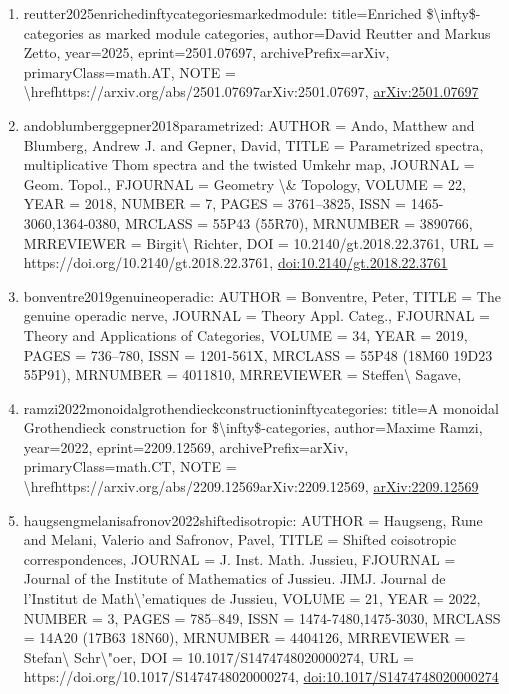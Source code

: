 \documentclass[11pt]{article}
\begin{document}
\begin{enumerate}[leftmargin=*]
  \item reutter2025enrichedinftycategoriesmarkedmodule: title=Enriched \$\textbackslash{}infty\$-categories as marked module categories, author=David Reutter and Markus Zetto, year=2025, eprint=2501.07697, archivePrefix=arXiv, primaryClass=math.AT, NOTE = \textbackslash{}hrefhttps://arxiv.org/abs/2501.07697arXiv:2501.07697, \href{https://arxiv.org/abs/2501.07697}{arXiv:2501.07697}
  \item andoblumberggepner2018parametrized: AUTHOR = Ando, Matthew and Blumberg, Andrew J. and Gepner, David, TITLE = Parametrized spectra, multiplicative Thom spectra and the twisted Umkehr map, JOURNAL = Geom. Topol., FJOURNAL = Geometry \textbackslash{}\& Topology, VOLUME = 22, YEAR = 2018, NUMBER = 7, PAGES = 3761--3825, ISSN = 1465-3060,1364-0380, MRCLASS = 55P43 (55R70), MRNUMBER = 3890766, MRREVIEWER = Birgit\textbackslash{} Richter, DOI = 10.2140/gt.2018.22.3761, URL = https://doi.org/10.2140/gt.2018.22.3761, \href{https://doi.org/10.2140/gt.2018.22.3761}{doi:10.2140/gt.2018.22.3761}
  \item bonventre2019genuineoperadic: AUTHOR = Bonventre, Peter, TITLE = The genuine operadic nerve, JOURNAL = Theory Appl. Categ., FJOURNAL = Theory and Applications of Categories, VOLUME = 34, YEAR = 2019, PAGES = 736--780, ISSN = 1201-561X, MRCLASS = 55P48 (18M60 19D23 55P91), MRNUMBER = 4011810, MRREVIEWER = Steffen\textbackslash{} Sagave,
  \item ramzi2022monoidalgrothendieckconstructioninftycategories: title=A monoidal Grothendieck construction for \$\textbackslash{}infty\$-categories, author=Maxime Ramzi, year=2022, eprint=2209.12569, archivePrefix=arXiv, primaryClass=math.CT, NOTE = \textbackslash{}hrefhttps://arxiv.org/abs/2209.12569arXiv:2209.12569, \href{https://arxiv.org/abs/2209.12569}{arXiv:2209.12569}
  \item haugsengmelanisafronov2022shiftedisotropic: AUTHOR = Haugseng, Rune and Melani, Valerio and Safronov, Pavel, TITLE = Shifted coisotropic correspondences, JOURNAL = J. Inst. Math. Jussieu, FJOURNAL = Journal of the Institute of Mathematics of Jussieu. JIMJ. Journal de l'Institut de Math\textbackslash{}'ematiques de Jussieu, VOLUME = 21, YEAR = 2022, NUMBER = 3, PAGES = 785--849, ISSN = 1474-7480,1475-3030, MRCLASS = 14A20 (17B63 18N60), MRNUMBER = 4404126, MRREVIEWER = Stefan\textbackslash{} Schr\textbackslash{}"oer, DOI = 10.1017/S1474748020000274, URL = https://doi.org/10.1017/S1474748020000274, \href{https://doi.org/10.1017/S1474748020000274}{doi:10.1017/S1474748020000274}

\end{enumerate}
\end{document}
